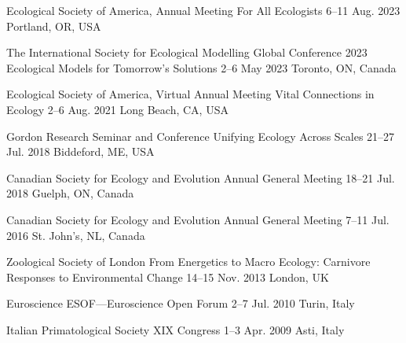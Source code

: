 \begin{cventries}

  \cventry
    {Ecological Society of America, Annual Meeting} %
    {For All Ecologists} %
    {6--11 Aug. 2023} %
    {Portland, OR, USA} %
    {}

  \cventry
    {The International Society for Ecological Modelling Global Conference 2023} %
    {Ecological Models for Tomorrow's Solutions} %
    {2--6 May 2023} %
    {Toronto, ON, Canada} %
    {}

  \cventry
    {Ecological Society of America, Virtual Annual Meeting} %
    {Vital Connections in Ecology} %
    {2--6 Aug. 2021} %
    {Long Beach, CA, USA} %
    {}

  \cventry
    {Gordon Research Seminar and Conference} %
    {Unifying Ecology Across Scales} %
    {21--27 Jul. 2018} %
    {Biddeford, ME, USA} %
    {}

  \cventry
    {Canadian Society for Ecology and Evolution} %
    {Annual General Meeting} %
    {18--21 Jul. 2018} %
    {Guelph, ON, Canada} %
    {}

  \cventry
    {Canadian Society for Ecology and Evolution} %
    {Annual General Meeting} %
    {7--11 Jul. 2016} %
    {St. John's, NL, Canada} %
    {}

  \cventry
    {Zoological Society of London} %
    {From Energetics to Macro Ecology: Carnivore Responses to Environmental Change} %
    {14--15 Nov. 2013} %
    {London, UK} %
    {}

  \cventry
    {Euroscience} %
    {ESOF---Euroscience Open Forum} %
    {2--7 Jul. 2010} %
    {Turin, Italy} %
    {}

  \cventry
    {Italian Primatological Society} %
    {XIX Congress} %
    {1--3 Apr. 2009} %
    {Asti, Italy} %
    {}

\end{cventries}
